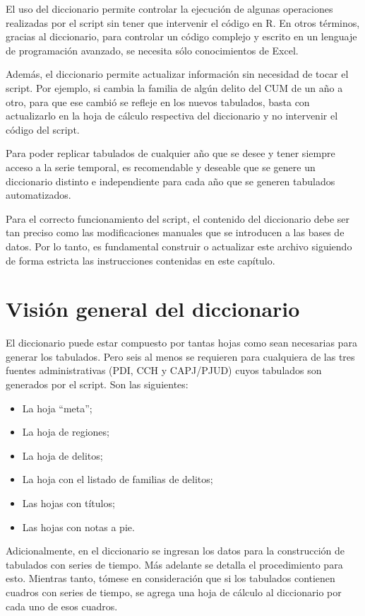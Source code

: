 \documentclass[
  spanish,
]{book}
\begin{document}
El uso del diccionario permite controlar la ejecución de algunas operaciones realizadas por el script sin tener que intervenir el código en R. En otros términos, gracias al diccionario, para controlar un código complejo y escrito en un lenguaje de programación avanzado, se necesita sólo conocimientos de Excel.

Además, el diccionario permite actualizar información sin necesidad de tocar el script. Por ejemplo, si cambia la familia de algún delito del CUM de un año a otro, para que ese cambió se refleje en los nuevos tabulados, basta con actualizarlo en la hoja de cálculo respectiva del diccionario y no intervenir el código del script.

Para poder replicar tabulados de cualquier año que se desee y tener siempre acceso a la serie temporal, es recomendable y deseable que se genere un diccionario distinto e independiente para cada año que se generen tabulados automatizados.

Para el correcto funcionamiento del script, el contenido del diccionario debe ser tan preciso como las modificaciones manuales que se introducen a las bases de datos. Por lo tanto, es fundamental construir o actualizar este archivo siguiendo de forma estricta las instrucciones contenidas en este capítulo.

\hypertarget{visiuxf3n-general-del-diccionario}{%
\section{Visión general del diccionario}\label{visiuxf3n-general-del-diccionario}}

El diccionario puede estar compuesto por tantas hojas como sean necesarias para generar los tabulados. Pero seis al menos se requieren para cualquiera de las tres fuentes administrativas (PDI, CCH y CAPJ/PJUD) cuyos tabulados son generados por el script. Son las siguientes:

\begin{itemize}
\item
  La hoja ``meta'';
\item
  La hoja de regiones;
\item
  La hoja de delitos;
\item
  La hoja con el listado de familias de delitos;
\item
  Las hojas con títulos;
\item
  Las hojas con notas a pie.
\end{itemize}

Adicionalmente, en el diccionario se ingresan los datos para la construcción de tabulados con series de tiempo. Más adelante se detalla el procedimiento para esto. Mientras tanto, tómese en consideración que si los tabulados contienen cuadros con series de tiempo, se agrega una hoja de cálculo al diccionario por cada uno de esos cuadros.
\end{document}
